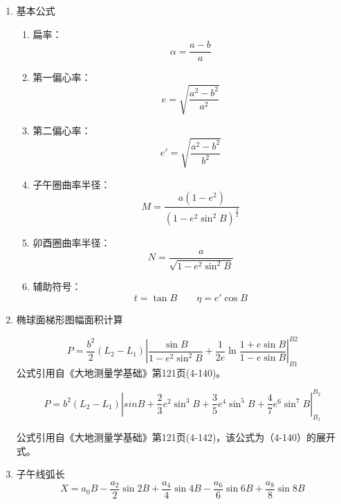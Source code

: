\begin{enumerate}

    \item 基本公式

          \begin{enumerate}
              \item 扁率：
                    $$\alpha=\frac{a-b}{a}$$

              \item 第一偏心率：
                    $$e=\sqrt{\frac{a^2-b^2}{a^2}}$$

              \item 第二偏心率：
                    $$e'=\sqrt{\frac{a^{2}-b^{2}}{b^{2}}}$$

              \item 子午圈曲率半径：
                    $$M=\frac{a(1-e^2)}{(1-e^2\sin ^2 B)^{\frac{3}{2}}}$$

              \item 卯酉圈曲率半径：
                    $$N=\frac{a}{\sqrt{1-e^2\sin^2 B}}$$

              \item 辅助符号：
                    $$t=\tan B\qquad\eta=e'\cos B$$
          \end{enumerate}

    \item 椭球面梯形图幅面积计算

          $$P = \frac{b^2}{2}(L_2 - L_1) \left | \frac{\sin B}{1-e^2\sin^2 B}
              + \frac{1}{2e}\ln \frac{1+e\sin B}{1-e\sin B}\right |_{B1} ^{B2} $$
          公式引用自《大地测量学基础》第121页(4-140)。

          $$P=b^2(L_2 - L_1) \left | sinB + \frac{2}{3}e^2 \sin ^3 B
              + \frac{3}{5}e^4 \sin^5 B + \frac{4}{7}e^6 \sin ^7 B \right | _{B_1} ^{B_2}$$

          公式引用自《大地测量学基础》第121页(4-142)，该公式为（4-140）的展开式。

    \item 子午线弧长
          \begin{equation}
              \label{eq:xx}
              X=a_0 B - \frac{a_2}{2}\sin 2B + \frac{a_4}{4}\sin 4B
              - \frac{a_6}{6} \sin 6B  + \frac{a_8}{8}\sin 8B
          \end{equation}


\end{enumerate}
